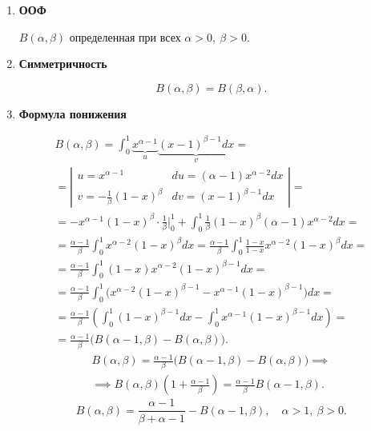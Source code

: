 \begin{enumerate}
    \item \textbf{ООФ}

          \begin{statement}
              $ B(\alpha,\beta) $ определенная при всех $ \alpha > 0, \ \beta > 0 $.
          \end{statement}

    \item \textbf{Симметричность}

          \begin{statement}
              \[
                  B(\alpha,\beta) = B(\beta,\alpha).
              \]
          \end{statement}

    \item \textbf{Формула понижения}

          \begin{note}
              \begin{multline*}
                  B(\alpha,\beta) = \int_{0}^{1}\underbrace{x^{\alpha-1}}_{u}\underbrace{(x-1)^{\beta-1}dx}_{v} = \\
                  = \left|\begin{array}{ll}
                      u = x^{\alpha-1}                & du = (\alpha-1)x^{\alpha-2}dx \\
                      v = -\frac{1}{\beta}(1-x)^\beta & dv = (x-1)^{\beta-1}dx
                  \end{array}\right| = \\
                  = -x^{\alpha-1}(1-x)^\beta \cdot \frac{1}{\beta}\Bigg|_0^1 + \int_{0}^{1}\frac{1}{\beta}(1-x)^\beta(\alpha - 1)x^{\alpha-2}dx = \\
                  = \frac{\alpha -1}{\beta}\int_{0}^{1}x^{\alpha-2}(1-x)^\beta dx = \frac{\alpha - 1}{\beta}\int_{0}^{1}\frac{1-x}{1-x}x^{\alpha-2}(1-x)^\beta dx = \\
                  = \frac{\alpha -1}{\beta}\int_{0}^{1}(1-x)x^{\alpha-2}(1-x)^{\beta-1}dx = \\
                  = \frac{\alpha - 1}{\beta}\int_{0}^{1}\bigl(x^{\alpha-2}(1-x)^{\beta-1} - x^{\alpha-1}(1-x)^{\beta-1}\bigr)dx = \\
                  = \frac{\alpha-1}{\beta}\left(\int_{0}^{1}(1-x)^{\beta-1}dx - \int_{0}^{1}x^{\alpha-1}(1-x)^{\beta-1}dx\right) = \\
                  = \frac{\alpha-1}{\beta}\bigl(B(\alpha-1,\beta) - B(\alpha,\beta)\bigr).
              \end{multline*}
              \begin{multline*}
                  B(\alpha,\beta) = \frac{\alpha-1}{\beta}\bigl(B(\alpha-1,\beta) - B(\alpha,\beta)\bigr) \implies \\
                  \implies B(\alpha,\beta)\left(1 + \frac{\alpha - 1}{\beta}\right) = \frac{\alpha-1}{\beta}B(\alpha-1,\beta).
              \end{multline*}
              \[
                  \boxed{B(\alpha,\beta) = \frac{\alpha -1}{\beta + \alpha -1} - B(\alpha-1,\beta)}, \quad \alpha > 1, \ \beta > 0.
              \]


\end{note}
\end{enumerate}
